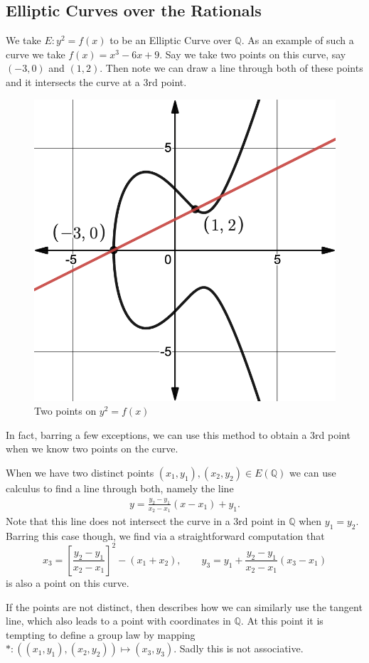 \subsection{Elliptic Curves over the Rationals}
\label{sub:elliptic_curves_over_the_rationals}
We take $E: y^2 = f(x)$ to be an Elliptic Curve over $\mathbb{Q}$.
As an example of such a curve we take $f(x) = x^3 - 6x + 9$.
Say we take two points on this curve, say $(-3, 0)$ and $(1,2)$.
Then note we can draw a line through both of these points and it intersects
the curve at a 3rd point.
\begin{figure}[H]
  \centering
  \includegraphics[width=0.5\linewidth]{ellipticCurves/ellipticCurveImage1.png}
  \caption{Two points on $y^2 = f(x)$ }%
  \label{fig:ellipticCurves/ellipticCurveImage1}
\end{figure}
In fact, barring a few exceptions, we can use this method to obtain
a 3rd point when we know two points on the curve.

When we have two distinct points $(x_1,y_1), (x_2,y_2) \in E(\mathbb{Q})$ we can use
calculus to find a line through both, namely the line
\begin{align*}
  y = \frac{y_2 - y_1}{x_2 - x_1} (x - x_1) + y_1.
\end{align*}
Note that this line does not intersect the curve in a 3rd point in $\mathbb{Q}$
when $y_1 = y_2$. Barring this case though, we find via a straightforward computation
that
\begin{equation} \label{eq:3rdPoint}
  x_3 = \left[ \frac{y_2 - y_1}{x_2 - x_1}  \right]^2 - (x_1 + x_2), \qquad y_3 = y_1 + \frac{y_2 - y_1}{x_2 - x_1} (x_3 - x_1)
\end{equation}
is also a point on this curve.

If the points are not distinct, then \cite[chapter 1.4]{silvermanRationalPoints}
describes how we can similarly use the tangent line, which also leads
to a point with coordinates in $\mathbb{Q}$.
\emptyline
At this point it is tempting to define a group law
by mapping $*: ((x_1,y_1), (x_2, y_2)) \mapsto (x_3, y_3)$. Sadly this
is not associative.


